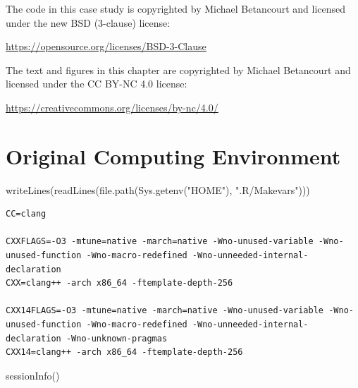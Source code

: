 \documentclass[
  letterpaper,
  DIV=11,
  numbers=noendperiod]{scrartcl}
\newenvironment{Shaded}{\begin{snugshade}}{\end{snugshade}}
\newcommand{\FunctionTok}[1]{\textcolor[rgb]{0.28,0.35,0.67}{#1}}
\newcommand{\NormalTok}[1]{\textcolor[rgb]{0.00,0.23,0.31}{#1}}
\newcommand{\StringTok}[1]{\textcolor[rgb]{0.13,0.47,0.30}{#1}}
\begin{document}
The code in this case study is copyrighted by Michael Betancourt and
licensed under the new BSD (3-clause) license:

\url{https://opensource.org/licenses/BSD-3-Clause}

The text and figures in this chapter are copyrighted by Michael
Betancourt and licensed under the CC BY-NC 4.0 license:

\url{https://creativecommons.org/licenses/by-nc/4.0/}

\section*{Original Computing
Environment}\label{original-computing-environment}

\begin{Shaded}
\begin{Highlighting}[]
\FunctionTok{writeLines}\NormalTok{(}\FunctionTok{readLines}\NormalTok{(}\FunctionTok{file.path}\NormalTok{(}\FunctionTok{Sys.getenv}\NormalTok{(}\StringTok{"HOME"}\NormalTok{), }\StringTok{".R/Makevars"}\NormalTok{)))}
\end{Highlighting}
\end{Shaded}

\begin{verbatim}
CC=clang

CXXFLAGS=-O3 -mtune=native -march=native -Wno-unused-variable -Wno-unused-function -Wno-macro-redefined -Wno-unneeded-internal-declaration
CXX=clang++ -arch x86_64 -ftemplate-depth-256

CXX14FLAGS=-O3 -mtune=native -march=native -Wno-unused-variable -Wno-unused-function -Wno-macro-redefined -Wno-unneeded-internal-declaration -Wno-unknown-pragmas
CXX14=clang++ -arch x86_64 -ftemplate-depth-256
\end{verbatim}

\begin{Shaded}
\begin{Highlighting}[]
\FunctionTok{sessionInfo}\NormalTok{()}
\end{Highlighting}
\end{Shaded}
\end{document}
